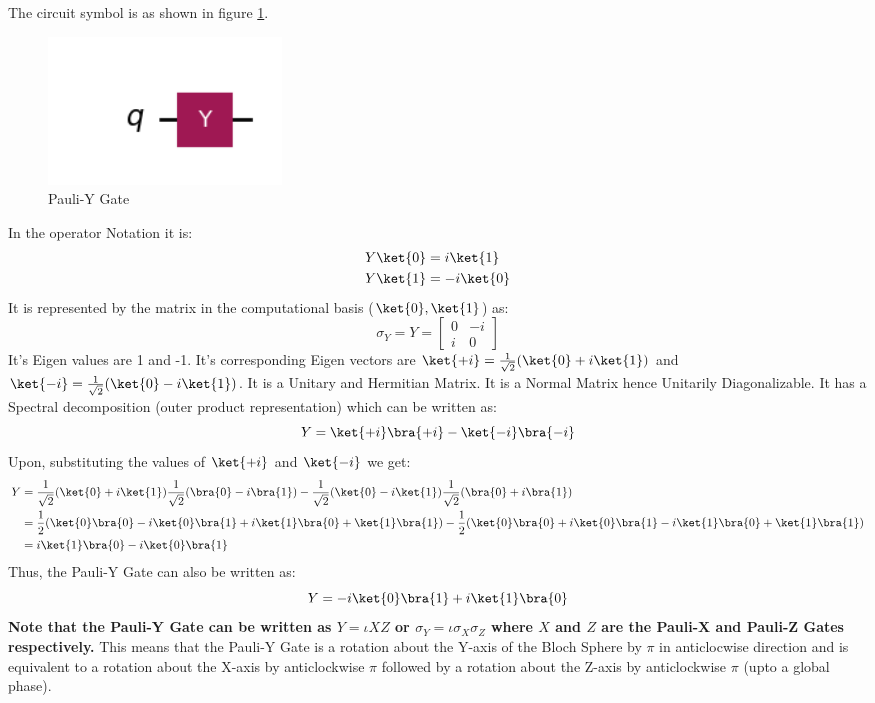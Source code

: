 \documentclass[12pt, oneside]{book}
\theoremstyle{definition}
\theoremstyle{definition}
\theoremstyle{remark}
\begin{document}
The circuit symbol is as shown in figure \ref{fig:pauli-y}.
\begin{figure}[H]
    \centering
    \includegraphics[width=0.3\textwidth]{../images/pauli-y.png}
    \caption{Pauli-Y Gate}
    \label{fig:pauli-y}
\end{figure}
In the operator Notation it is:
\begin{align*}
    Y\ket{0}&=i\ket{1} \\
    Y\ket{1}&=-i\ket{0}
\end{align*}
It is represented by the matrix in the computational basis ($\ket{0},\ket{1}$) as:
\[
    \sigma_Y=Y=\begin{bmatrix}
        0 & -i \\
        i & 0
    \end{bmatrix}
\]
It's Eigen values are 1 and -1. It's corresponding Eigen vectors are $\ket{+i}=\frac{1}{\sqrt{2}}(\ket{0}+i\ket{1})$ and $\ket{-i}=\frac{1}{\sqrt{2}}(\ket{0}-i\ket{1})$.
It is a Unitary and Hermitian Matrix. It is a Normal Matrix hence Unitarily Diagonalizable.
It has a Spectral decomposition (outer product representation) which can be written as:
\[
    Y=\ket{+i}\bra{+i}-\ket{-i}\bra{-i}
\]
Upon, substituting the values of $\ket{+i}$ and $\ket{-i}$ we get:
\begin{align*}
    Y&=\dfrac{1}{\sqrt{2}}(\ket{0}+i\ket{1})\dfrac{1}{\sqrt{2}}(\bra{0}-i\bra{1})-\dfrac{1}{\sqrt{2}}(\ket{0}-i\ket{1})\dfrac{1}{\sqrt{2}}(\bra{0}+i\bra{1})\\
    &=\dfrac{1}{2}(\ket{0}\bra{0}-i\ket{0}\bra{1}+i\ket{1}\bra{0}+\ket{1}\bra{1})-\dfrac{1}{2}(\ket{0}\bra{0}+i\ket{0}\bra{1}-i\ket{1}\bra{0}+\ket{1}\bra{1})\\
    &=i\ket{1}\bra{0}-i\ket{0}\bra{1}
\end{align*}
Thus, the Pauli-Y Gate can also be written as:
\[
    Y=-i\ket{0}\bra{1}+i\ket{1}\bra{0}
\]
\textbf{Note that the Pauli-Y Gate can be written as $Y=\iota XZ$ or $\sigma_Y=\iota \sigma_X\sigma_Z$  where $X$ and $Z$ are the Pauli-X and Pauli-Z Gates respectively.}
This means that the Pauli-Y Gate is a rotation about the Y-axis of the Bloch Sphere by $\pi$ in anticlocwise direction and is equivalent to a rotation about the X-axis by anticlockwise $\pi$ followed by a rotation about the Z-axis by anticlockwise $\pi$
(upto a global phase).
\end{document}
